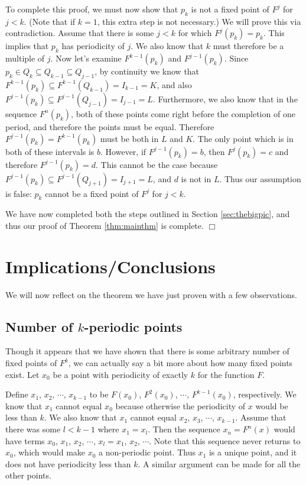 \documentclass[12pt]{IEEEtran}
\begin{document}
To complete this proof, we must now show that $p_k$ is not a fixed point of $F^j$ for $j < k$. (Note that if $k = 1$, this extra step is not necessary.) We will prove this via contradiction. Assume that there is some $j < k$ for which $F^j \left( p_k \right) = p_k$. This implies that $p_k$ has periodicity of $j$. We also know that $k$ must therefore be a multiple of $j$. Now let's examine $F^{k-1} \left( p_k \right)$ and $F^{j-1} \left( p_k \right)$. Since $p_k \in Q_k \subseteq Q_{k-1} \subseteq Q_{j-1}$, by continuity we know that $F^{k-1} \left( p_k \right) \subseteq F^{k-1} \left( Q_{k-1} \right) = I_{k-1} = K$, and also $F^{j-1} \left( p_k \right) \subseteq F^{j-1} \left( Q_{j-1} \right) = I_{j-1} = L$. Furthermore, we also know that in the sequence $F^n \left( p_k \right)$, both of these points come right before the completion of one period, and therefore the points must be equal. Therefore $F^{j-1} \left( p_k \right) = F^{k-1} \left( p_k \right)$ must be both in $L$ and $K$. The only point which is in both of these intervals is $b$. However, if $F^{j-1} \left( p_k \right) = b$, then $F^{j} \left( p_k \right) = c$ and therefore $F^{j-1} \left( p_k \right) = d$. This cannot be the case because $F^{j-1} \left( p_k \right) \subseteq F^{j-1} \left( Q_{j+1} \right) = I_{j+1} = L$, and $d$ is not in $L$. Thus our assumption is false: $p_k$ cannot be a fixed point of $F^j$ for $j < k$.

We have now completed both the steps outlined in Section \ref{sec:thebigpic}, and thus our proof of Theorem \ref{thm:mainthm} is complete. $\Box$



\section{Implications/Conclusions}

We will now reflect on the theorem we have just proven with a few observations.

\subsection{Number of $k$-periodic points}

Though it appears that we have shown that there is some arbitrary number of fixed points of $F^k$, we can actually say a bit more about how many fixed points exist. Let $x_0$ be a point with periodicity of exactly $k$ for the function $F$.

Define $x_1$, $x_2$, $\cdots$, $x_{k-1}$ to be $F \left( x_0 \right)$, $F^2 \left( x_0 \right)$, $\cdots$, $F^{k-1} \left( x_0 \right)$, respectively. We know that $x_1$ cannot equal $x_0$ because otherwise the periodicity of $x$ would be less than $k$. We also know that $x_1$  cannot equal $x_2$, $x_3$, $\cdots$, $x_{k-1}$. Assume that there was some $l < k-1$ where $x_1 = x_l$. Then the sequence $x_n = F^n \left( x \right)$ would have terms $x_0$, $x_1$, $x_2$, $\cdots$, $x_l = x_1$, $x_2$, $\cdots$. Note that this sequence never returns to $x_0$, which would make $x_0$ a non-periodic point. Thus $x_1$ is a unique point, and it does not have periodicity less than $k$. A similar argument can be made for all the other points.
\end{document}
